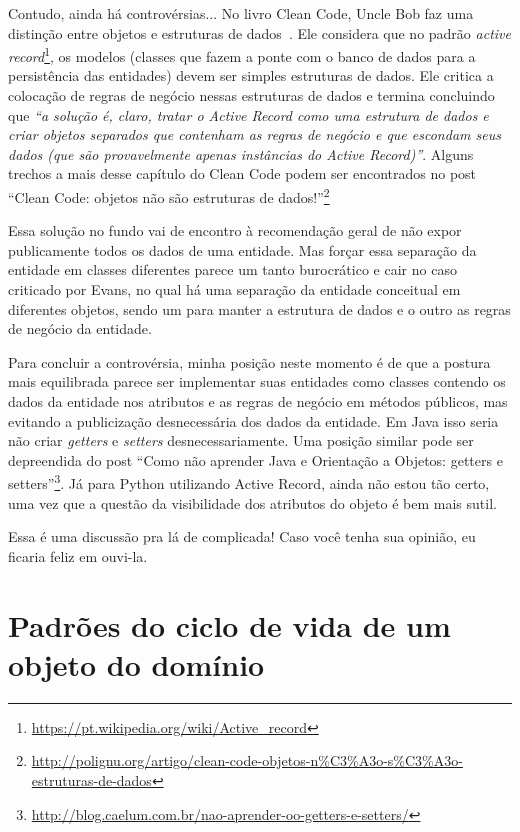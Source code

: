 \documentclass[a4paper, 12pt]{article}
\newcommand{\citacao}[1]{\emph{``#1''}}
\begin{document}
Contudo, ainda há controvérsias... No livro Clean Code, Uncle Bob faz uma distinção entre objetos e estruturas de dados~\cite{Bob2008DataStructures}. Ele considera que no padrão \emph{active record}\footnote{\url{https://pt.wikipedia.org/wiki/Active_record}}, os modelos (classes que fazem a ponte com o banco de dados para a persistência das entidades) devem ser simples estruturas de dados. Ele critica a colocação de regras de negócio nessas estruturas de dados e termina concluindo que \citacao{a solução é, claro, tratar o Active Record como uma estrutura de dados e criar objetos separados que contenham as regras de negócio e que escondam seus dados (que são provavelmente apenas instâncias do Active Record)}. Alguns trechos a mais desse capítulo do Clean Code podem ser encontrados no post ``Clean Code: objetos não são estruturas de dados!''\footnote{\url{http://polignu.org/artigo/clean-code-objetos-n\%C3\%A3o-s\%C3\%A3o-estruturas-de-dados}} 

Essa solução no fundo vai de encontro à recomendação geral de não expor publicamente todos os dados de uma entidade. Mas forçar essa separação da entidade em classes diferentes parece um tanto burocrático e cair no caso criticado por Evans, no qual há uma separação da entidade conceitual em diferentes objetos, sendo um para manter a estrutura de dados e o outro as regras de negócio da entidade.

Para concluir a controvérsia, minha posição neste momento é de que a postura mais equilibrada parece ser implementar suas entidades como classes contendo os dados da entidade nos atributos e as regras de negócio em métodos públicos, mas evitando a publicização desnecessária dos dados da entidade. Em Java isso seria não criar \emph{getters} e \emph{setters} desnecessariamente. Uma posição similar pode ser depreendida do post ``Como não aprender Java e Orientação a Objetos: getters e setters''\footnote{\url{http://blog.caelum.com.br/nao-aprender-oo-getters-e-setters/}}. Já para Python utilizando Active Record, ainda não estou tão certo, uma vez que a questão da visibilidade dos atributos do objeto é bem mais sutil. 

Essa é uma discussão pra lá de complicada! Caso você tenha sua opinião, eu ficaria feliz em ouvi-la.

\section{Padrões do ciclo de vida de um objeto do domínio}
\end{document}

